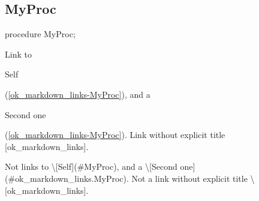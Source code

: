 \documentclass{report}
\newif\ifpdf
\begin{document}
\subsection*{MyProc}
\fi
\label{ok_markdown_links-MyProc}
\begin{list}{}{
\setlength{\itemindent}{0cm}
\setlength{\listparindent}{0cm}
\setlength{\leftmargin}{\evensidemargin}
\addtolength{\leftmargin}{\tmplength}
\settowidth{\labelsep}{X}
\addtolength{\leftmargin}{\labelsep}
\setlength{\labelwidth}{\tmplength}
}
\item[\textbf{Declaration}\hfill]
\ifpdf
\begin{flushleft}
\fi
\begin{ttfamily}
procedure MyProc;\end{ttfamily}

\ifpdf
\end{flushleft}
\fi

\par
\item[\textbf{Description}]
Link to \begin{ttfamily}Self\end{ttfamily}(\ref{ok_markdown_links-MyProc}), and a \begin{ttfamily}Second one\end{ttfamily}(\ref{ok_markdown_links-MyProc}). Link without explicit title [ok{\_}markdown{\_}links].

Not links to {\textbackslash}[Self]({\#}MyProc), and a {\textbackslash}[Second one]({\#}ok{\_}markdown{\_}links.MyProc). Not a link without explicit title {\textbackslash}[ok{\_}markdown{\_}links].

\end{list}
\end{document}
